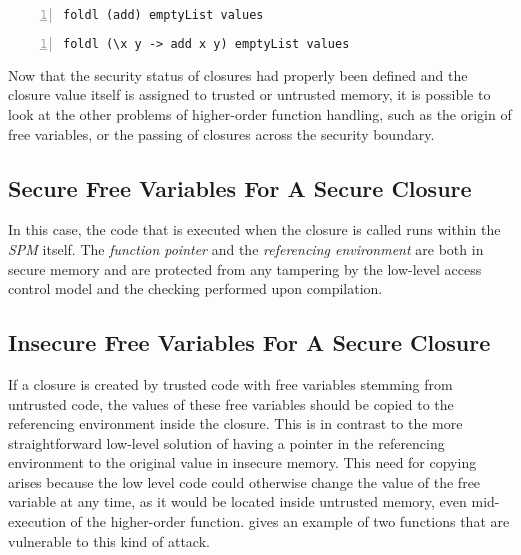 \documentclass[10pt,a4paper,master=cws, masteroption=ai,english,inputenc=utf8]{kulemt}
\begin{document}
\begin{lstlisting}[frame=single, language=ML,caption=Passing a predefined function., label=code:implicit,numbers=left]
foldl (add) emptyList values
\end{lstlisting}

\begin{lstlisting}[frame=single, language=ML,caption={Passing a predefined function, unsugared.}, label=code:explicit,numbers=left]
foldl (\x y -> add x y) emptyList values
\end{lstlisting}

Now that the security status of closures had properly been defined and the closure value itself is assigned to trusted or untrusted memory, it is possible to look at the other problems of higher-order function handling, such as the origin of free variables, or the passing of closures across the security boundary.





\subsection{Secure Free Variables For A Secure Closure}

In this case, the code that is executed when the closure is called runs within the \emph{SPM} itself.
The \emph{function pointer} and the \emph{referencing environment} are both in secure memory and are protected from any tampering by the low-level access control model and the checking performed upon compilation.

\subsection{Insecure Free Variables For A Secure Closure}
If a closure is created by trusted code with free variables stemming from untrusted code, the values of these free variables should be copied to the referencing environment inside the closure. This is in contrast to the more straightforward low-level solution of having a pointer in the referencing environment to the original value in insecure memory.
This need for copying arises because the low level code could otherwise change the value of the free variable at any time, as it would be located inside untrusted memory, even mid-execution of the higher-order function.
 gives an example of two functions that are vulnerable to this kind of attack.
\end{document}
